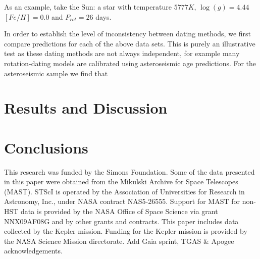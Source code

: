 \documentclass[useAMS, usenatbib, preprint, 12pt]{aastex}
\newcommand{\racomment}[1]{{\color{red}#1}}
\begin{document}
As an example, take the Sun: a star with temperature $5777K$, $ \log(g) =
4.44$ $[Fe/H] = 0.0$ and $P_{rot} = 26$ days.

In order to establish the level of inconsistency between dating methods, we
first compare predictions for each of the above data sets.
This is purely an illustrative test as these dating methods are not always
independent, for example many rotation-dating models are calibrated using
asteroseismic age predictions.
For the asteroseismic sample we find that

\section{Results and Discussion}
\label{sec:results}

\section{Conclusions}

This research was funded by the Simons Foundation.
Some of the data presented in this paper were obtained from the Mikulski
Archive for Space Telescopes (MAST).
STScI is operated by the Association of Universities for Research in
Astronomy, Inc., under NASA contract NAS5-26555.
Support for MAST for non-HST data is provided by the NASA Office of Space
Science via grant NNX09AF08G and by other grants and contracts.
This paper includes data collected by the Kepler mission. Funding for the
Kepler mission is provided by the NASA Science Mission directorate.
\racomment{Add Gaia sprint, TGAS \& Apogee acknowledgements.}



\end{document}
